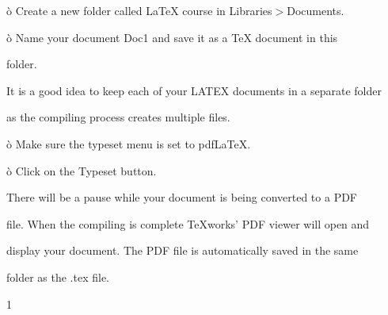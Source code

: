 \documentclass[a4paper,portrait,12pt]{article}
\begin{document}
\begin{flushleft}
\`{o} Create a new folder called LaTeX course in Libraries$>$Documents.
\end{flushleft}


\begin{flushleft}
\`{o} Name your document Doc1 and save it as a TeX document in this
\end{flushleft}


\begin{flushleft}
folder.
\end{flushleft}





\begin{flushleft}
It is a good idea to keep each of your LATEX documents in a separate folder
\end{flushleft}


\begin{flushleft}
as the compiling process creates multiple files.
\end{flushleft}





\begin{flushleft}
\`{o} Make sure the typeset menu is set to pdfLaTeX.
\end{flushleft}


\begin{flushleft}
\`{o} Click on the Typeset button.
\end{flushleft}


\begin{flushleft}
There will be a pause while your document is being converted to a PDF
\end{flushleft}


\begin{flushleft}
file. When the compiling is complete TeXworks' PDF viewer will open and
\end{flushleft}


\begin{flushleft}
display your document. The PDF file is automatically saved in the same
\end{flushleft}


\begin{flushleft}
folder as the .tex file.
\end{flushleft}


1
\end{document}
